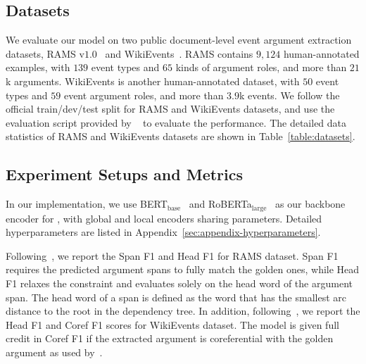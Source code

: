 \subsection{Datasets}
We evaluate our model on two public document-level event argument extraction datasets, RAMS v$1.0$~\cite{rams} and WikiEvents~\cite{wikievent}.
RAMS contains $9,124$ human-annotated examples, with $139$ event types and $65$ kinds of argument roles, and more than $21$k arguments.
WikiEvents is another human-annotated dataset, with $50$ event types and $59$ event argument roles, and more than $3.9$k events.
We follow the official train/dev/test split for RAMS and WikiEvents datasets, and use the evaluation script provided by ~\citet{rams} to evaluate the performance.
The detailed data statistics of RAMS and WikiEvents datasets are shown in Table~\ref{table:datasets}.

\begin{table}[t]
\centering
{}
\caption{
Statistics of RAMS and WikiEvents datasets.
}
\label{table:datasets}
\end{table}


\subsection{Experiment Setups and  Metrics}

In our implementation, we use BERT$_{\mathrm{base}}$~\cite{bert} and RoBERTa$_{\mathrm{large}}$~\cite{roberta} as our backbone encoder for \modelname, with global and local encoders sharing parameters.
Detailed hyperparameters are listed in Appendix~\ref{sec:appendix-hyperparameters}.

Following~\citet{two-step}, we report the Span F1 and Head F1 for RAMS dataset.
Span F1 requires the predicted argument spans to fully match the golden ones, while Head F1 relaxes the constraint and evaluates solely on the head word of the argument span.
The head word of a span is defined as the word that has the smallest arc distance to the root in the dependency tree.
In addition, following~\citet{wikievent}, we report the Head F1 and Coref F1 scores for WikiEvents dataset.
The model is given full credit in Coref F1 if the extracted argument is coreferential with the golden argument as used by~\citet{coref}.

